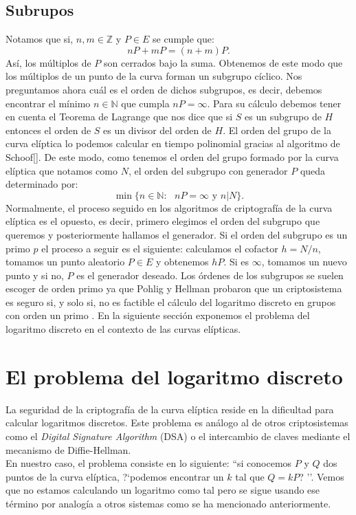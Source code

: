 \documentclass[11pt]{article}
\begin{document}
\subsection{Subrupos}
Notamos que si, $ n, m \in \mathbb{Z} $ y $ P \in E $ se cumple que:
\[
nP + mP = (n+m)P.
\]
Así, los múltiplos de $ P $ son cerrados bajo la suma. Obtenemos de este modo que los múltiplos de un punto de la curva forman un subgrupo cíclico. Nos preguntamos ahora cuál es el orden de dichos subgrupos, es decir, debemos encontrar el mínimo $ n \in \mathbb{N} $ que cumpla $ nP = \infty $. Para su cálculo debemos tener en cuenta el Teorema de Lagrange que nos dice que si $ S $ es un subgrupo de $ H $ entonces el orden de $ S $ es un divisor del orden de $ H $. El orden del grupo de la curva elíptica lo podemos calcular en tiempo polinomial gracias al algoritmo de Schoof[]. De este modo, como tenemos el orden del grupo formado por la curva elíptica que notamos como $ N $, el orden del subgrupo con generador $ P $ queda determinado por:
\[
\min\{ n \in \mathbb{N}:\text{ } nP = \infty \text{ y } n | N\}.
\]
Normalmente, el proceso seguido en los algoritmos de criptografía de la curva elíptica es el opuesto, es decir, primero elegimos el orden del subgrupo que queremos y posteriormente hallamos el generador. Si el orden del subgrupo es un primo $ p $ el proceso a seguir es el siguiente: calculamos el cofactor $ h = N/n $, tomamos un punto aleatorio $ P \in E $ y obtenemos $ hP $. Si es $\infty$, tomamos un nuevo punto y si no, $ P $ es el generador deseado. Los órdenes de los subgrupos se suelen escoger de orden primo ya que Pohlig y Hellman probaron que un criptosistema es seguro si, y solo si, no es factible el cálculo del logaritmo discreto en grupos con orden un primo \cite{pohlig1978improved}. En la siguiente sección exponemos el problema del logaritmo discreto en el contexto de las curvas elípticas. \\
\section{El problema del logaritmo discreto}
\label{sec:log}
La seguridad de la criptografía de la curva elíptica reside en la dificultad para calcular logaritmos discretos. Este problema es análogo al de otros criptosistemas como el \textit{Digital Signature Algorithm} (DSA) o el intercambio de claves mediante el mecanismo de Diffie-Hellman.\\

En nuestro caso, el problema consiste en lo siguiente: ``si conocemos $ P $ y $ Q $ dos puntos de la curva elíptica, ?`podemos encontrar un $ k $ tal que $ Q = kP $? ''. Vemos que no estamos calculando un logaritmo como tal pero se sigue usando ese término por analogía a otros sistemas como se ha mencionado anteriormente.\\
\end{document}
